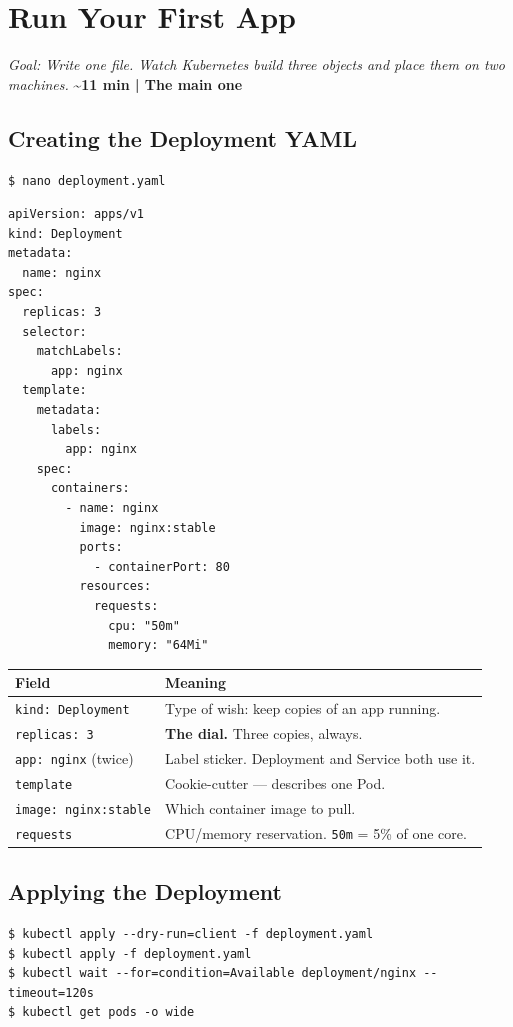\documentclass[12pt,a4paper]{report}
\begin{document}
\chapter{Run Your First App}
\textit{Goal: Write one file. Watch Kubernetes build three objects and place them on two machines.}
\hfill \textbf{\textasciitilde11 min | The main one}

\section{Creating the Deployment YAML}
\begin{lstlisting}
$ nano deployment.yaml
\end{lstlisting}

\begin{lstlisting}
apiVersion: apps/v1
kind: Deployment
metadata:
  name: nginx
spec:
  replicas: 3
  selector:
    matchLabels:
      app: nginx
  template:
    metadata:
      labels:
        app: nginx
    spec:
      containers:
        - name: nginx
          image: nginx:stable
          ports:
            - containerPort: 80
          resources:
            requests:
              cpu: "50m"
              memory: "64Mi"
\end{lstlisting}

\begin{center}
\begin{tabular}{lp{8.5cm}}
\toprule
Field & Meaning \\
\midrule
\texttt{kind: Deployment}    & Type of wish: keep copies of an app running. \\
\texttt{replicas: 3}         & \textbf{The dial.} Three copies, always. \\
\texttt{app: nginx} (twice)  & Label sticker. Deployment and Service both use it. \\
\texttt{template}            & Cookie-cutter --- describes one Pod. \\
\texttt{image: nginx:stable} & Which container image to pull. \\
\texttt{requests}            & CPU/memory reservation. \texttt{50m} = 5\% of one core. \\
\bottomrule
\end{tabular}
\end{center}

\section{Applying the Deployment}
\begin{lstlisting}
$ kubectl apply --dry-run=client -f deployment.yaml
$ kubectl apply -f deployment.yaml
$ kubectl wait --for=condition=Available deployment/nginx --timeout=120s
$ kubectl get pods -o wide
\end{lstlisting}
\end{document}
